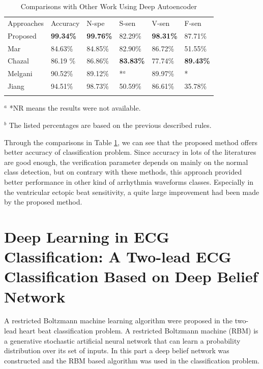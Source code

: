 \documentclass[graybox]{svmult}
\begin{document}
\begin{table}
\caption{Comparisons with Other Work Using Deep Autoencoder}
\label{tab:6}       %
%
%
\begin{tabular}{p{2cm}p{1.9cm}p{1.8cm}p{1.8cm}p{1.8cm}p{1.8cm}}
\hline\noalign{\smallskip}
 Approaches     &  Accuracy & N-spe & S-sen & V-sen & F-sen  \\
\noalign{\smallskip}\svhline\noalign{\smallskip}
Proposed             & \textbf{99.34\%}  & \textbf{99.76\%} &  82.29\% & \textbf{98.31\%} & 87.71\% \\
 Mar\cite{mar}        & 84.63\%  & 84.85\% & 82.90\%  & 86.72\% & 51.55\% \\
 Chazal\cite{chaza}   & 86.19 \% & 86.86\% & \textbf{83.83\%}  & 77.74\% & \textbf{89.43\%} \\
 Melgani\cite{melgan} & 90.52\%  & 89.12\% & *$^a$    & 89.97\% & * \\
 Jiang \cite{jiang}   & 94.51\%  & 98.73\% & 50.59\%  & 86.61\% & 35.78\% \\
\noalign{\smallskip}\hline\noalign{\smallskip}
\end{tabular}

$^a$ *NR means the results were not available.

$^b$ The listed percentages are based on the previous described rules.
\end{table}

Through the comparisons in Table \ref{tab:6}, we can see that the proposed method offers better accuracy of classification problem. Since accuracy in lots of the literatures are good enough, the verification parameter depends on mainly on the normal class detection, but on contrary with these methods, this approach provided better performance in other kind of arrhythmia waveforms classes. Especially in the ventricular ectopic beat sensitivity, a quite large improvement had been made by the proposed method.




\section{Deep Learning in ECG Classification: A Two-lead ECG Classification Based on Deep Belief Network}
A restricted Boltzmann machine learning algorithm were proposed in the two-lead heart beat classification problem. A restricted Boltzmann machine (RBM) is a generative stochastic artificial neural network that can learn a probability distribution over its set of inputs. In this part a deep belief network was constructed and the RBM based algorithm was used in the classification problem. 
\end{document}
